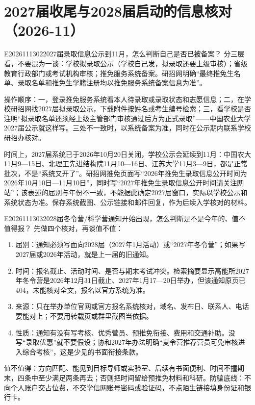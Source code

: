 \section{2027届收尾与2028届启动的信息核对（2026-11）}

\begin{qa}{E2026111302}{2027届录取信息公示到11月，怎么判断自己是否已被备案？}
分三层看，不要混为一谈：学校拟录取公示（学校自己发，拟录取还要上级审核）；省级教育行政部门或考试机构审核；推免服务系统备案。研招网明确“最终推免生名单、录取名单和推免生学籍注册均以推免服务系统备案信息为准”。

操作顺序：一，登录推免服务系统看本人待录取或录取状态和志愿信息；二，在学校研招网找2027届拟录取公示，下载附件按姓名或考生编号检索；三，看学校是否注明“拟录取名单还须经上级主管部门审核通过后方为正式录取”——中国农业大学2027届公示就这样写。三处不一致时，以系统备案为准，同时在公示期内联系学校研招办核对。

时间上，2027届系统已于2026年10月20日关闭，学校公示会延续到11月：中国农大11月9—15日、北理工先进结构院11月10—16日、江苏大学11月3—9日，都是正常批次，不是“系统又开了”。研招网推免页面写“2026年推免生录取信息公开时间为2026年10月10日—11月10日”，同时写“2027年推免生录取信息公开时间请关注网站”；该表述的届别与年份不一致，不能据此确定2027届窗口，实际以学校公示和系统状态为准。保存系统截图、公示链接和邮件回复，作为后续入学核对的材料。
\end{qa}

\begin{qa}{E2026111303}{2028届冬令营/科学营通知开始出现，怎么判断是不是今年的、值不值得报？}
先做四个核对，再谈值不值：
\begin{enumerate}
  \item 届别：通知必须写面向2028届（2027年1月活动）或“2027年冬令营”；如果写2027届或2026年活动，就是上一届的旧通知。
  \item 时间：报名截止、活动时间、是否与期末考试冲突。检索摘要显示高能所2027年冬令营是2026年12月31日截止、2027年1月17—20日举办，但该通知原页已404，未能核对全文，报名以官方系统为准。
  \item 来源：只在举办单位官网或官方报名系统核对，域名、发布日、联系人、电话要能对上；不要用转载页或群里截图当依据。
  \item 性质：通知有没有写考核、优秀营员、预推免衔接、费用和交通补助。没写“录取优惠”就不要假设；协和2027年办法明确“夏令营推荐营员可免审核进入综合考核”，这是少见的书面衔接条款。
\end{enumerate}

值不值得：方向匹配、能见到目标导师或实验室、后续有书面便利、时间不撞期末，四条中至少满足两条再去；否则把时间留给预推免材料和科研。防骗底线：不向个人账户交占位费，不交学信网账号密码或验证码，不点陌生链接填身份证和银行卡。
\end{qa}
